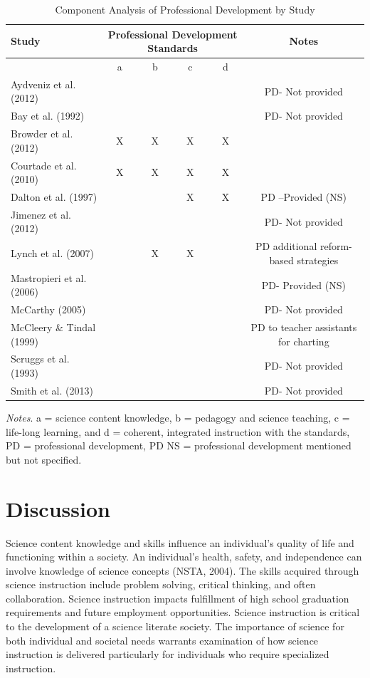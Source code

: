 \documentclass[11.5pt]{sig-alternate} %
\begin{document}
\begin{large}
\begin{table}
\caption{Component Analysis of Professional Development by Study}
\begin{tabular}{|l|c|c|c|c|c|}
\hline
Study & \multicolumn{4}{|c|}{Professional Development Standards} & Notes \\ \hline
& a & b & c & d & \\ \hline
Aydveniz et al. (2012) & & & & & PD- Not provided \\ \hline
Bay et al. (1992) & & & & & PD- Not provided \\ \hline
Browder et al. (2012) & X & X & X & X & \\ \hline
Courtade et al. (2010) & X & X & X & X & \\ \hline
Dalton et al. (1997) & & & X & X & PD –Provided (NS) \\ \hline
Jimenez et al. (2012) & & & & & PD- Not provided \\ \hline
Lynch et al. (2007)& & X & X & & PD additional reform-based strategies \\ \hline
Mastropieri et al. (2006) & & & & & PD- Provided (NS) \\ \hline
McCarthy (2005) & & & & & PD- Not provided \\ \hline
McCleery \& Tindal (1999) & & & & & PD to teacher assistants for charting \\ \hline
Scruggs et al. (1993) & & & & & PD- Not provided \\ \hline
Smith et al. (2013) & & & & & PD- Not provided \\ \hline
\end{tabular}
\textit{Notes}. a = science content knowledge, b = pedagogy and science teaching, c = life-long learning, and d = coherent, integrated instruction with the standards, PD = professional development, PD NS = professional development mentioned but not specified.
\end{table}

\section*{Discussion}

Science content knowledge and skills influence an individual’s quality of life and functioning within a society.  An individual’s health, safety, and independence can involve knowledge of science concepts (NSTA, 2004).  The skills acquired through science instruction include problem solving, critical thinking, and often collaboration.  Science instruction impacts fulfillment of high school graduation requirements and future employment opportunities.  Science instruction is critical to the development of a science literate society.  The importance of science for both individual and societal needs warrants examination of how science instruction is delivered particularly for individuals who require specialized instruction.


\end{large}
\end{document}
